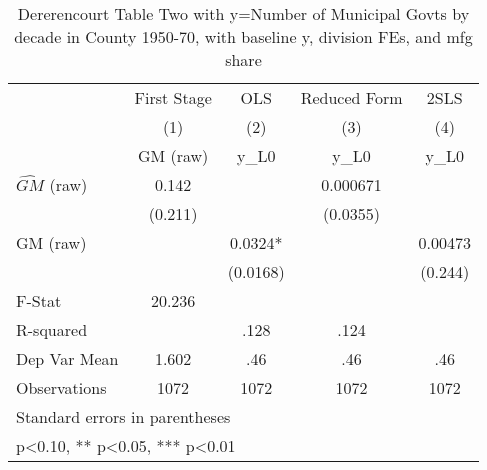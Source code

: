 \begin{table}[htbp]\centering
\def\sym#1{\ifmmode^{#1}\else\(^{#1}\)\fi}
\caption{Dererencourt Table Two with y=Number of Municipal Govts by decade in County 1950-70, with baseline y, division FEs, and mfg share}
\begin{tabular}{l*{4}{c}}
\toprule
                    & First Stage   &         OLS   &Reduced Form   &        2SLS   \\
                    &\multicolumn{1}{c}{(1)}&\multicolumn{1}{c}{(2)}&\multicolumn{1}{c}{(3)}&\multicolumn{1}{c}{(4)}\\
                    &\multicolumn{1}{c}{GM  (raw)}&\multicolumn{1}{c}{y\_L0}&\multicolumn{1}{c}{y\_L0}&\multicolumn{1}{c}{y\_L0}\\
\midrule
$\hat{GM}$ (raw)    &       0.142   &               &    0.000671   &               \\
                    &     (0.211)   &               &    (0.0355)   &               \\
\addlinespace
GM  (raw)           &               &      0.0324*  &               &     0.00473   \\
                    &               &    (0.0168)   &               &     (0.244)   \\
\midrule
F-Stat              &      20.236   &               &               &               \\
R-squared           &               &        .128   &        .124   &               \\
Dep Var Mean        &       1.602   &         .46   &         .46   &         .46   \\
Observations        &        1072   &        1072   &        1072   &        1072   \\
\bottomrule
\multicolumn{5}{l}{\footnotesize Standard errors in parentheses}\\
\multicolumn{5}{l}{\footnotesize * p<0.10, ** p<0.05, *** p<0.01}\\
\end{tabular}
\end{table}
